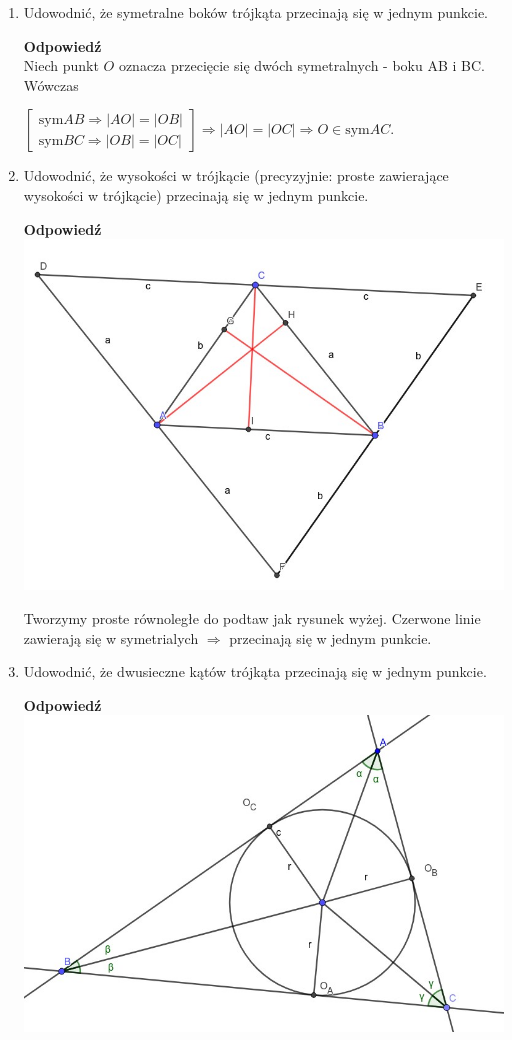 \documentclass[12pt,a4paper]{article}
\theoremstyle{break}
\newcommand{\Odp}[1]{
		\begin{mdframed}[style=zadanie]
			\textbf{Odpowiedź}\\
			#1
		\end{mdframed}
	}
\begin{document}
\begin{enumerate}[1.]
{		Trójkąty $ABF$ i $ACE$ są przystające (cecha BKB). $\Rightarrow$ $\angle AEC = \angle BFA \Rightarrow |CE| = |CF| \Rightarrow |AB|=|AC|$
	}
	
	\item Udowodnić, że symetralne boków trójkąta przecinają się w jednym punkcie.
	\Odp{
		Niech punkt $O$ oznacza przecięcie się dwóch symetralnych - boku AB i BC. Wówczas
		
		$
		\begin{bmatrix}
			\text{sym} AB \Rightarrow |AO|=|OB|\\
			\text{sym} BC \Rightarrow |OB|=|OC|
		\end{bmatrix} \Rightarrow |AO| = |OC| \Rightarrow O \in \text{sym} AC
		$.
		
	}
	
	\item Udowodnić, że wysokości w trójkącie (precyzyjnie: proste zawierające wysokości w trójkącie) przecinają się w jednym punkcie.
	\Odp{
		\includegraphics[width=0.6\linewidth]{trj_proof_6.jpeg}
		
		Tworzymy proste równoległe do podtaw jak rysunek wyżej. Czerwone linie zawierają się w symetrialych $\Rightarrow$ przecinają się w jednym punkcie.
	}
	
	\item Udowodnić, że dwusieczne kątów trójkąta przecinają się w jednym punkcie.
	\Odp{
		\includegraphics[width=0.6\linewidth]{trj_proof_7.jpeg}
		
}
\end{enumerate}
\end{document}
